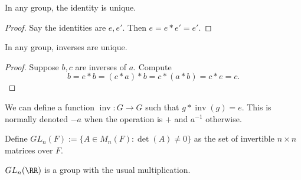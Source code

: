 \begin{prop}
In any group, the identity is unique.
\end{prop}

\begin{proof}
Say the identities are $e, e'$. Then $e = e * e' = e'$.
\end{proof}

\begin{prop}
In any group, inverses are unique.
\end{prop}

\begin{proof}
Suppose $b, c$ are inverses of $a$. Compute
\[ b = e * b = (c * a) * b = c * (a * b) = c * e = c. \]
\end{proof}

\begin{cor}
We can define a function $\operatorname{inv} : G \to G$ such that $g *
\operatorname{inv}(g) = e$. This is normally denoted $-a$ when the
operation is $+$ and $a^{-1}$ otherwise.
\end{cor}

\begin{df}
Define $GL_n(F) := \lbrace A \in M_n(F) : \det(A) \neq 0 \rbrace$ as the
set of invertible $n \times n$ matrices over $F$.
\end{df}

\begin{prop}
$GL_n(\RR)$ is a group with the usual multiplication.
\end{prop}
